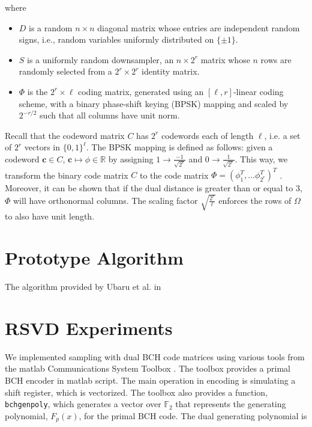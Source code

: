 \documentclass[12pt]{article}
\newcommand{\tbf}{\textbf}
\newcommand{\mB}{\mathbb}
\begin{document}
where 
\begin{itemize}
\item $D$ is a random $n \times n$ diagonal matrix whose entries are independent random signs, i.e., random variables uniformly distributed on $\{ \pm 1 \}$.

\item $S$ is a uniformly random downsampler, an $n \times 2^r$ matrix whose $n$ rows are randomly selected from a $2^r \times 2^r$ identity matrix.

\item $\Phi$ is the $2^r \times \ell$ coding matrix, generated using an $[ \ell, r]$-linear coding scheme, with a binary phase-shift keying (BPSK) mapping and scaled by $2^{-r/2}$ such that all columns have unit norm.

\end{itemize}
Recall that the codeword matrix $C$ has $2^r$ codewords each of length $\ell$, i.e. a set of $2^r$ vectors in $\{0,1\}^{\ell}$. The BPSK mapping is defined as follows: given a codeword $\tbf{c} \in C$, $\tbf{c} \mapsto \phi \in \mB{R}$ by assigning $1 \rightarrow \frac{-1}{\sqrt{2^r}}$ and $0 \rightarrow \frac{1}{\sqrt{2^r}}$. This way, we transform the binary code matrix $C$ to the code matrix $\Phi = (\phi_1^T,  \hdots \phi_{2^r}^T) ^T$ \cite{ubaru2015low}. Moreover, it can be shown that if the dual distance is greater than or equal to 3, $\Phi$ will have orthonormal columns. The scaling factor $\sqrt{\frac{2^r}{\ell}}$ enforces the rows of $\Omega$ to also have unit length.

\section{Prototype Algorithm}
The algorithm provided by Ubaru et al. in \cite{ubaru2015low} 


\section{RSVD Experiments}
We implemented sampling with dual BCH code matrices using various tools from the {\sc matlab} Communications System Toolbox \cite{matlab_cst_2015}.  The toolbox provides a primal BCH encoder in {\sc matlab} script.  The main operation in encoding is simulating a shift register, which is vectorized.  The toolbox also provides a function, \texttt{bchgenpoly}, which generates a vector over $\mathbb{F}_2$ that represents the generating polynomial, $F_p(x)$, for the primal BCH code.  The dual generating polynomial is 
\end{document}
